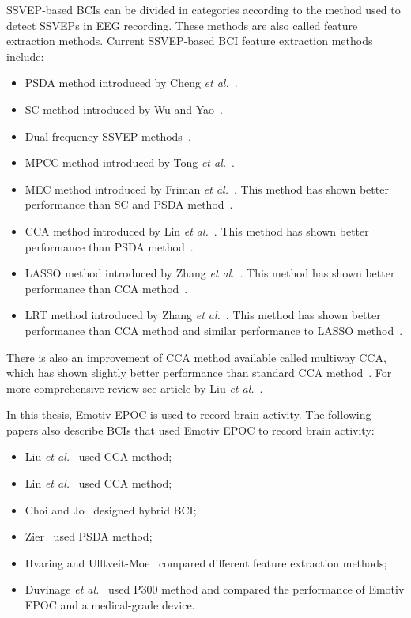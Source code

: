 \gls{SSVEP}-based \glspl{BCI} can be divided in categories according to the method used to detect \glspl{SSVEP} in \gls{EEG} recording. These methods are also called \gls{feature extraction} methods. Current \gls{SSVEP}-based \gls{BCI} \gls{feature extraction} methods include:
\begin{itemize}
	\item \Gls{PSDA} method introduced by Cheng \textit{et al.}~\cite{psda}.
	\item \Gls{SC} method introduced by Wu and Yao~\cite{sc}.
	\item Dual-frequency \gls{SSVEP} methods~\cite{dual1, dual2}.
	\item \Gls{MPCC} method introduced by Tong \textit{et al.}~\cite{MPCC}.
	\item \Gls{MEC} method introduced by Friman \textit{et al.}~\cite{mec}. This method has shown better performance than \gls{SC} and \gls{PSDA} method~\cite{mec_comparison}.
	\item \Gls{CCA} method introduced by Lin \textit{et al.}~\cite{cca_lin}. This method has shown better performance than \gls{PSDA} method~\cite{cca_psda, bin2009cca, cca_lin}.
	\item \Gls{LASSO} method introduced by Zhang \textit{et al.}~\cite{LASSO}. This method has shown better performance than \gls{CCA} method~\cite{LASSO}.
	\item \Gls{LRT} method introduced by Zhang \textit{et al.}~\cite{LRT}. This method has shown better performance than \gls{CCA} method and similar performance to \gls{LASSO} method~\cite{LRT}.
\end{itemize}
There is also an improvement of \gls{CCA} method available called multiway \gls{CCA}, which has shown slightly better performance than standard \gls{CCA} method~\cite{mcca}. For more comprehensive review see article by Liu \textit{et al.}~\cite{feature_extraction}.

In this thesis, Emotiv EPOC is used to record brain activity. The following papers also describe \glspl{BCI} that used Emotiv EPOC to record brain activity:
\begin{itemize}
	\item Liu \textit{et al.}~\cite{emotiv_11hz} used \gls{CCA} method;
	\item Lin \textit{et al.}~\cite{emotiv_walking} used \gls{CCA} method;
	\item Choi and Jo~\cite{emotiv_hybrid} designed hybrid \gls{BCI};
	\item Zier~\cite{emotiv_psda} used \gls{PSDA} method;
	\item Hvaring and Ulltveit-Moe~\cite{emotiv_comparison} compared different \gls{feature extraction} methods;
	\item Duvinage \textit{et al.}~\cite{emotiv_p300_comp} used P300 method and compared the performance of Emotiv EPOC and a medical-grade device.
\end{itemize}


